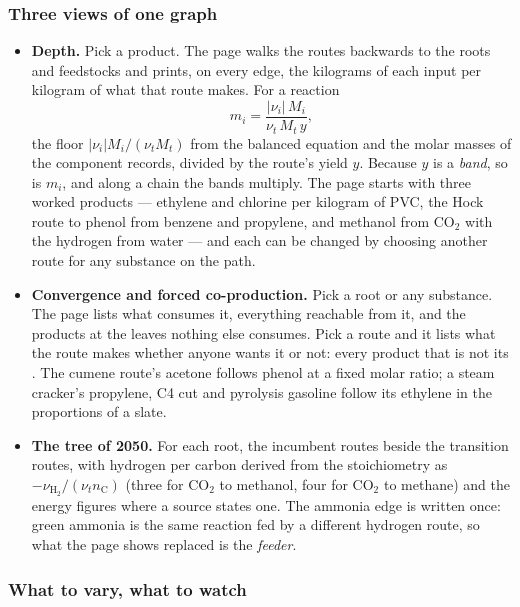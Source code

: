 \documentclass[11pt,a4paper]{article}
\begin{document}
\subsubsection*{Three views of one graph}

\begin{itemize}[leftmargin=*,nosep]
  \item \textbf{Depth.}  Pick a product.  The page walks the routes
        backwards to the roots and feedstocks and prints, on every edge, the
        kilograms of each input per kilogram of what that route makes.  For a
        reaction
        \[
          m_i = \frac{|\nu_i|\,M_i}{\nu_t\,M_t\,y},
        \]
        the floor $|\nu_i| M_i/(\nu_t M_t)$ from the balanced equation and the
        molar masses of the component records, divided by the route's yield
        $y$.  Because $y$ is a \emph{band}, so is $m_i$, and along a chain the
        bands multiply.  The page starts with three worked products ---
        ethylene and chlorine per kilogram of PVC, the Hock route to phenol
        from benzene and propylene, and methanol from CO$_2$ with the hydrogen
        from water --- and each can be changed by choosing another route for
        any substance on the path.
  \item \textbf{Convergence and forced co-production.}  Pick a root or any
        substance.  The page lists what consumes it, everything reachable from
        it, and the products at the leaves nothing else consumes.  Pick a
        route and it lists what the route makes whether anyone wants it or
        not: every product that is not its .  The cumene route's
        acetone follows phenol at a fixed molar ratio; a steam cracker's
        propylene, C4 cut and pyrolysis gasoline follow its ethylene in the
        proportions of a slate.
  \item \textbf{The tree of 2050.}  For each root, the incumbent routes beside
        the transition routes, with hydrogen per carbon derived from the
        stoichiometry as $-\nu_{\mathrm{H_2}}/(\nu_t n_{\mathrm{C}})$ (three
        for CO$_2$ to methanol, four for CO$_2$ to methane) and the energy
        figures where a source states one.  The ammonia edge is written once:
        green ammonia is the same reaction fed by a different hydrogen route,
        so what the page shows replaced is the \emph{feeder}.
\end{itemize}

\subsubsection*{What to vary, what to watch}
\end{document}
